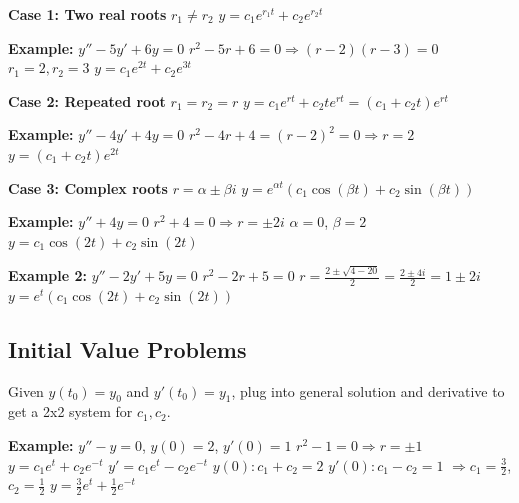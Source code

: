 \textbf{Case 1: Two real roots} $r_1 \neq r_2$
$y = c_1 e^{r_1 t} + c_2 e^{r_2 t}$

\textbf{Example:} $y'' - 5y' + 6y = 0$
$r^2 - 5r + 6 = 0 \Rightarrow (r-2)(r-3) = 0$
$r_1 = 2, r_2 = 3$
$y = c_1 e^{2t} + c_2 e^{3t}$

\textbf{Case 2: Repeated root} $r_1 = r_2 = r$
$y = c_1 e^{rt} + c_2 t e^{rt} = (c_1 + c_2 t)e^{rt}$

\textbf{Example:} $y'' - 4y' + 4y = 0$
$r^2 - 4r + 4 = (r-2)^2 = 0 \Rightarrow r = 2$
$y = (c_1 + c_2 t)e^{2t}$

\textbf{Case 3: Complex roots} $r = \alpha \pm \beta i$
$y = e^{\alpha t}(c_1 \cos(\beta t) + c_2 \sin(\beta t))$

\textbf{Example:} $y'' + 4y = 0$
$r^2 + 4 = 0 \Rightarrow r = \pm 2i$
$\alpha = 0$, $\beta = 2$
$y = c_1 \cos(2t) + c_2 \sin(2t)$

\textbf{Example 2:} $y'' - 2y' + 5y = 0$
$r^2 - 2r + 5 = 0$
$r = \frac{2 \pm \sqrt{4-20}}{2} = \frac{2 \pm 4i}{2} = 1 \pm 2i$
$y = e^{t}(c_1 \cos(2t) + c_2 \sin(2t))$

\subsection{Initial Value Problems}
Given $y(t_0) = y_0$ and $y'(t_0) = y_1$, plug into general solution
and derivative to get a 2x2 system for $c_1, c_2$.

\textbf{Example:} $y'' - y = 0$, $y(0)=2$, $y'(0)=1$
$r^2 - 1 = 0 \Rightarrow r = \pm 1$
$y = c_1 e^t + c_2 e^{-t}$
$y' = c_1 e^t - c_2 e^{-t}$
$y(0): c_1 + c_2 = 2$
$y'(0): c_1 - c_2 = 1$
$\Rightarrow c_1 = \frac{3}{2}$, $c_2 = \frac{1}{2}$
$y = \frac{3}{2}e^t + \frac{1}{2}e^{-t}$
